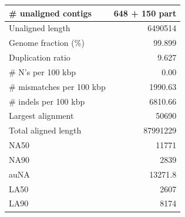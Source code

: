 \documentclass[12pt,a4paper]{article}
\begin{document}
\begin{table}[ht]
\begin{center}
\begin{tabular}{|l*{1}{|r}|}
\# unaligned contigs & 648 + 150 part \\ \hline
Unaligned length & 6490514 \\ \hline
Genome fraction (\%) & 99.899 \\ \hline
Duplication ratio & 9.627 \\ \hline
\# N's per 100 kbp & 0.00 \\ \hline
\# mismatches per 100 kbp & 1990.63 \\ \hline
\# indels per 100 kbp & 6810.66 \\ \hline
Largest alignment & 50690 \\ \hline
Total aligned length & 87991229 \\ \hline
NA50 & 11771 \\ \hline
NA90 & 2839 \\ \hline
auNA & 13271.8 \\ \hline
LA50 & 2607 \\ \hline
LA90 & 8174 \\ \hline
\end{tabular}
\end{center}
\end{table}
\end{document}
